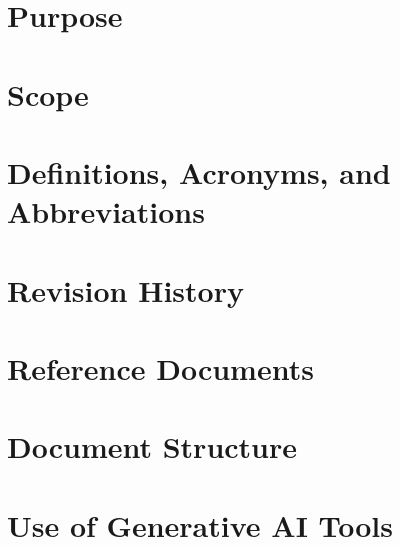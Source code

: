 \section{Purpose}

\section{Scope}

\section{Definitions, Acronyms, and Abbreviations}

\section{Revision History}

\section{Reference Documents}

\section{Document Structure}

\section{Use of Generative AI Tools}
